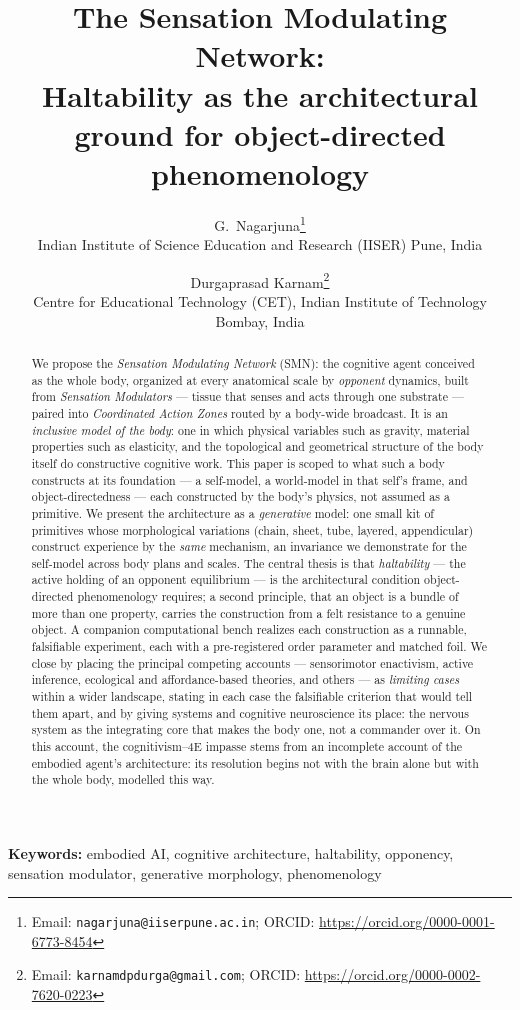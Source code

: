 \documentclass{article}
\title{The Sensation Modulating Network:\\
Haltability as the architectural ground for object-directed
phenomenology}
\author{
G.~Nagarjuna\thanks{Email: \texttt{nagarjuna@iiserpune.ac.in};
ORCID: \url{https://orcid.org/0000-0001-6773-8454}}\\
\small Indian Institute of Science Education and Research (IISER) Pune, India
\and
Durgaprasad Karnam\thanks{Email: \texttt{karnamdpdurga@gmail.com};
ORCID: \url{https://orcid.org/0000-0002-7620-0223}}\\
\small Centre for Educational Technology (CET), Indian Institute of Technology Bombay, India
}
\date{}
\begin{document}
\maketitle

\begin{abstract}
We propose the \emph{Sensation Modulating Network} (SMN): the cognitive
agent conceived as the whole body, organized at every anatomical scale
by \emph{opponent} dynamics, built from \emph{Sensation Modulators} ---
tissue that senses and acts through one substrate --- paired into
\emph{Coordinated Action Zones} routed by a body-wide broadcast.  It is
an \emph{inclusive model of the body}: one in which physical variables
such as gravity, material properties such as elasticity, and the
topological and geometrical structure of the body itself do
constructive cognitive work.  This
paper is scoped to what such a body constructs at its foundation --- a
self-model, a world-model in that self's frame, and object-directedness
--- each constructed by the body's physics, not assumed as a primitive.
We present the
architecture as a \emph{generative} model: one small kit of primitives
whose morphological variations (chain, sheet, tube, layered,
appendicular) construct experience by the \emph{same} mechanism, an
invariance we demonstrate for the self-model across body plans and
scales.  The central thesis is that \emph{haltability} --- the active
holding of an opponent equilibrium --- is the architectural condition
object-directed phenomenology requires; a second principle, that an
object is a bundle of more than one property, carries the construction
from a felt resistance to a genuine object.  A companion computational
bench realizes each construction as a runnable, falsifiable experiment,
each with a pre-registered order parameter and matched foil.  We close
by placing the principal competing accounts --- sensorimotor
enactivism, active inference, ecological and affordance-based theories,
and others --- as \emph{limiting cases} within a wider landscape, stating
in each case the falsifiable criterion that would tell them apart, and by
giving systems and cognitive neuroscience its place: the nervous system as
the integrating core that makes the body one, not a commander over it.
On this account, the cognitivism--4E impasse stems from an incomplete
account of the embodied agent's architecture: its resolution begins
not with the brain alone but with the whole body, modelled this way.
\end{abstract}

\noindent\textbf{Keywords:}
embodied AI, cognitive architecture, haltability, opponency,
sensation modulator, generative morphology, phenomenology
\end{document}
